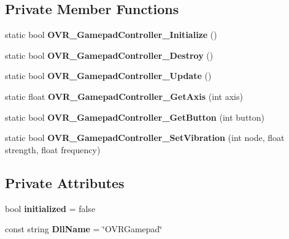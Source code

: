 \subsection*{Private Member Functions}
\begin{DoxyCompactItemize}
\item 
\mbox{\label{class_o_v_r_input_1_1_o_v_r_controller_gamepad_mac_a6e46dcf32631a7e4308e6cb3472b19d2}} 
static bool {\bfseries O\+V\+R\+\_\+\+Gamepad\+Controller\+\_\+\+Initialize} ()
\item 
\mbox{\label{class_o_v_r_input_1_1_o_v_r_controller_gamepad_mac_abe404090e19e183cd839e4128ecbbcef}} 
static bool {\bfseries O\+V\+R\+\_\+\+Gamepad\+Controller\+\_\+\+Destroy} ()
\item 
\mbox{\label{class_o_v_r_input_1_1_o_v_r_controller_gamepad_mac_a059a00244d95e09c9e2cd6a7255e1b8e}} 
static bool {\bfseries O\+V\+R\+\_\+\+Gamepad\+Controller\+\_\+\+Update} ()
\item 
\mbox{\label{class_o_v_r_input_1_1_o_v_r_controller_gamepad_mac_abeef941ec0d2a74d25e5dae8d3bca5c9}} 
static float {\bfseries O\+V\+R\+\_\+\+Gamepad\+Controller\+\_\+\+Get\+Axis} (int axis)
\item 
\mbox{\label{class_o_v_r_input_1_1_o_v_r_controller_gamepad_mac_afda7f0d6e925f595954e801d1b18664c}} 
static bool {\bfseries O\+V\+R\+\_\+\+Gamepad\+Controller\+\_\+\+Get\+Button} (int button)
\item 
\mbox{\label{class_o_v_r_input_1_1_o_v_r_controller_gamepad_mac_a8a61570c19a56dd6fe14216e4527f7fc}} 
static bool {\bfseries O\+V\+R\+\_\+\+Gamepad\+Controller\+\_\+\+Set\+Vibration} (int node, float strength, float frequency)
\end{DoxyCompactItemize}
\subsection*{Private Attributes}
\begin{DoxyCompactItemize}
\item 
\mbox{\label{class_o_v_r_input_1_1_o_v_r_controller_gamepad_mac_a44400bce5d7ac05ec060f91e6ff0333b}} 
bool {\bfseries initialized} = false
\item 
\mbox{\label{class_o_v_r_input_1_1_o_v_r_controller_gamepad_mac_a66942e09460b8022dba042e5e40b58e3}} 
const string {\bfseries Dll\+Name} = \char`\"{}O\+V\+R\+Gamepad\char`\"{}
\end{DoxyCompactItemize}
